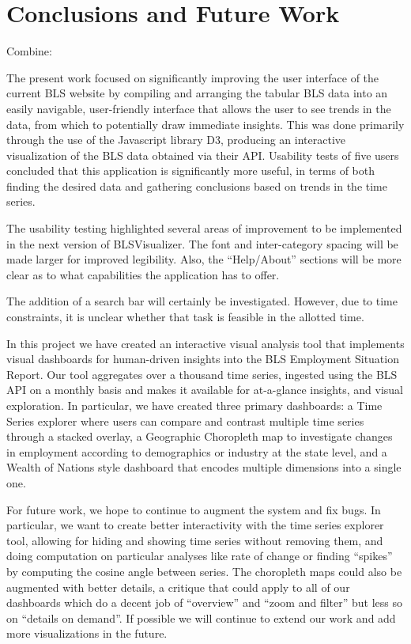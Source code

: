 \documentclass{sigchi}
\newcommand\Peter[1]{{\color{red}#1}}	%
\newcommand\Ben[1]{{\color{blue}#1}}	%
\begin{document}
\section{Conclusions and Future Work}
Combine:

\Peter{The present work focused on significantly improving the user interface of the current BLS website by compiling and arranging the tabular BLS data into an easily navigable, user-friendly interface that allows the user to see trends in the data, from which to potentially draw immediate insights. This was done primarily through the use of the Javascript library D3, producing an interactive visualization of the BLS data obtained via their API. Usability tests of five users concluded that this application is significantly more useful, in terms of both finding the desired data and gathering conclusions based on trends in the time series.

The usability testing highlighted several areas of improvement to be implemented in the next version of BLSVisualizer. The font and inter-category spacing will be made larger for improved legibility. Also, the ``Help/About'' sections will be more clear as to what capabilities the application has to offer.

The addition of a search bar will certainly be investigated. However, due to time constraints, it is unclear whether that task is feasible in the allotted time. }

\Ben{In this project we have created an interactive visual analysis tool that implements visual dashboards for human-driven insights into the BLS Employment Situation Report. Our tool aggregates over a thousand time series, ingested using the BLS API on a monthly basis and makes it available for at-a-glance insights, and visual exploration. In particular, we have created three primary dashboards: a Time Series explorer where users can compare and contrast multiple time series through a stacked overlay, a Geographic Choropleth map to investigate changes in employment according to demographics or industry at the state level, and a Wealth of Nations style dashboard that encodes multiple dimensions into a single one.

For future work, we hope to continue to augment the system and fix bugs. In particular, we want to create better interactivity with the time series explorer tool, allowing for hiding and showing time series without removing them, and doing computation on particular analyses like rate of change or finding ``spikes'' by computing the cosine angle between series. The choropleth maps could also be augmented with better details, a critique that could apply to all of our dashboards which do a decent job of ``overview'' and ``zoom and filter'' but less so on ``details on demand''. If possible we will continue to extend our work and add more visualizations in the future.}
\end{document}
